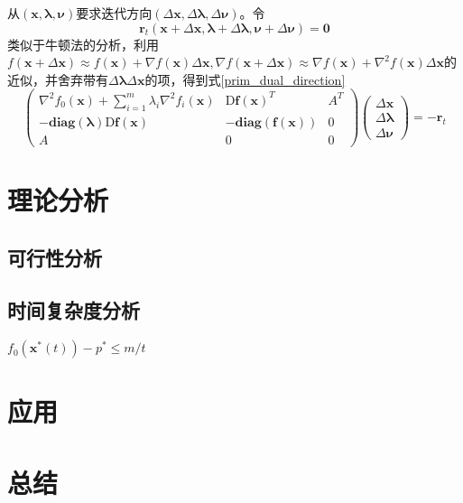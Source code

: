 \documentclass{article}
\begin{document}
从$(\bm x,\bm\lambda,\bm\nu)$要求迭代方向$(\Delta\bm x,\Delta\bm\lambda,\Delta\bm\nu)$。令$$\bm r_t(\bm x+\Delta\bm x,\bm\lambda+\Delta\bm\lambda,\bm\nu+\Delta\bm\nu)=\bm 0$$
类似于牛顿法的分析，利用$f(\bm x+\Delta\bm x)\approx f(\bm x)+\nabla f(\bm x)\Delta\bm x,\nabla f(\bm x+\Delta \bm x)\approx\nabla f(\bm x)+\nabla^2f(\bm x)\Delta \bm x$的近似，并舍弃带有$\Delta\bm\lambda\Delta\bm x$的项，得到式\eqref{prim_dual_direction}
\begin{equation}
    \label{prim_dual_direction}\begin{pmatrix}
    \nabla^2f_0(\bm x)+\sum\limits_{i=1}^m{\lambda_i\nabla^2f_i(\bm x)} & \text{D}\textbf{f}(\bm x)^T & A^T \\
    -\textbf{diag}(\bm\lambda)\text{D}\textbf{f}(\bm x) & -\textbf{diag}(\textbf{f}(\bm x)) & 0 \\
    A & 0 & 0
\end{pmatrix}\begin{pmatrix}
    \Delta\bm x\\
    \Delta\bm\lambda\\
    \Delta\bm\nu
\end{pmatrix}=-\bm r_t\end{equation}
\section{理论分析}
\subsection{可行性分析}
\subsection{时间复杂度分析}
\label{time_complexity}
$f_0(\bm x^*(t))-p^*\le m/t$
\section{应用}
\section{总结}
\end{document}
